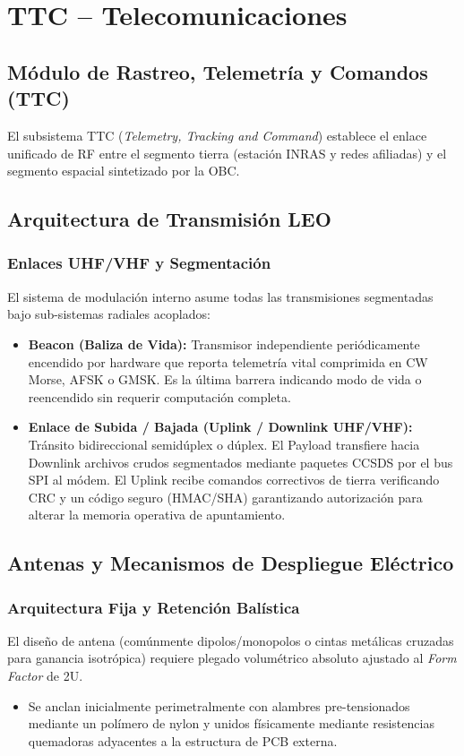 \chapter{TTC – Telecomunicaciones}

\section{Módulo de Rastreo, Telemetría y Comandos (TTC)}
El subsistema TTC (\textit{Telemetry, Tracking and Command}) establece el enlace unificado de RF entre el segmento tierra (estación INRAS y redes afiliadas) y el segmento espacial sintetizado por la OBC.

\section{Arquitectura de Transmisión LEO}

\subsection{Enlaces UHF/VHF y Segmentación}
El sistema de modulación interno asume todas las transmisiones segmentadas bajo sub-sistemas radiales acoplados:
\begin{itemize}
    \item \textbf{Beacon (Baliza de Vida):} Transmisor independiente periódicamente encendido por hardware que reporta telemetría vital comprimida en CW Morse, AFSK o GMSK. Es la última barrera indicando modo de vida o reencendido sin requerir computación completa.
    \item \textbf{Enlace de Subida / Bajada (Uplink / Downlink UHF/VHF):} Tránsito bidireccional semidúplex o dúplex. El Payload transfiere hacia Downlink archivos crudos segmentados mediante paquetes CCSDS por el bus SPI al módem. El Uplink recibe comandos correctivos de tierra verificando CRC y un código seguro (HMAC/SHA) garantizando autorización para alterar la memoria operativa de apuntamiento.
\end{itemize}

\section{Antenas y Mecanismos de Despliegue Eléctrico}
\subsection{Arquitectura Fija y Retención Balística}
El diseño de antena (comúnmente dipolos/monopolos o cintas metálicas cruzadas para ganancia isotrópica) requiere plegado volumétrico absoluto ajustado al \textit{Form Factor} de 2U.
\begin{itemize}
    \item Se anclan inicialmente perimetralmente con alambres pre-tensionados mediante un polímero de nylon y unidos físicamente mediante resistencias quemadoras adyacentes a la estructura de PCB externa.
\end{itemize}

